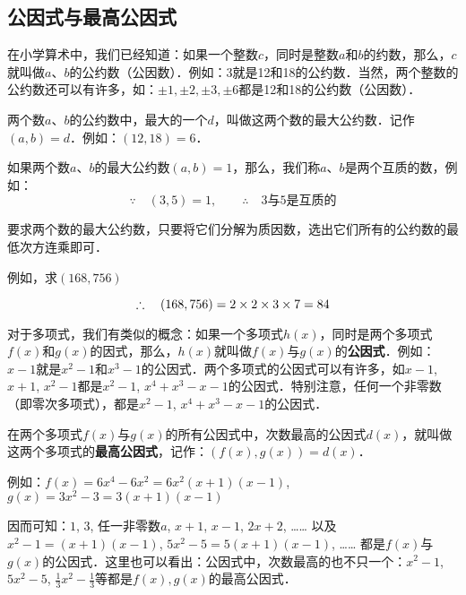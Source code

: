 \subsection{公因式与最高公因式}
在小学算术中，我们已经知道：如果一个整数$c$，同时是整数$a$和$b$的约数，那么，$c$就叫做$a$、$b$的公约数（公因数）．例如：3就是12和18的公约数．当然，两个整数的公约数还可以有许多，如：$\pm 1,\pm 2,\pm 3,\pm 6$都是12和18的公约数（公因数）．

两个数$a$、$b$的公约数中，最大的一个$d$，叫做这两个数的最大公约数．记作$(a,b)=d$．例如：$(12, 18)=6$．

如果两个数$a$、$b$的最大公约数$(a,b)=1$，那么，我们称$a$、$b$是两个互质的数，例如：
\[\because\quad (3,5)=1,\qquad \therefore\quad \text{3与5是互质的}\]

要求两个数的最大公约数，只要将它们分解为质因数，选出它们所有的公约数的最低次方连乘即可．

例如，求$(168,756)$
\begin{center}
\end{center}
\[\therefore \quad (168, 756)=2\times 2\times 3\times 7=84\]

对于多项式，我们有类似的概念：如果一个多项式$h(x)$，同时是两个多项式$f(x)$和$g(x)$的因式，那么，$h(x)$就叫做$f(x)$与$g(x)$的\textbf{公因式}．例如：$x-1$就是$x^2-1$和$x^3-1$的公因式．两个多项式的公因式可以有许多，如$x-1$, $x+1$, $x^2-1$都是$x^2-1$, $x^4+x^3-x-1$的公因式．特别注意，任何一个非零数（即零次多项式），都是$x^2-1$, $x^4+x^3-x-1$的公因式．

在两个多项式$f(x)$与$g(x)$的所有公因式中，次数最高的公因式$d(x)$，就叫做这两个多项式的\textbf{最高公因式}，记作：$(f(x),g(x))=d(x)$．

例如：$f(x)=6x^4-6x^2=6x^2(x+1)(x-1)$, 
$g (x) =3x^2-3=3 (x+1) (x-1)$

因而可知：$1$, $3$, 任一非零数$a$, $x+1$, $x-1$, $2x+2$, …… 以及$x^2-1=(x+1)(x-1)$, $5x^2-5=5(x+1)(x-1)$, …… 都是$f(x)$与$g(x)$的公因式．这里也可以看出：公因式中，次数最高的也不只一个：$x^2-1$,$5x^2-5$, $\frac{1}{3}x^2-\frac{1}{3}$等都是$f(x),g(x)$的最高公因式．


